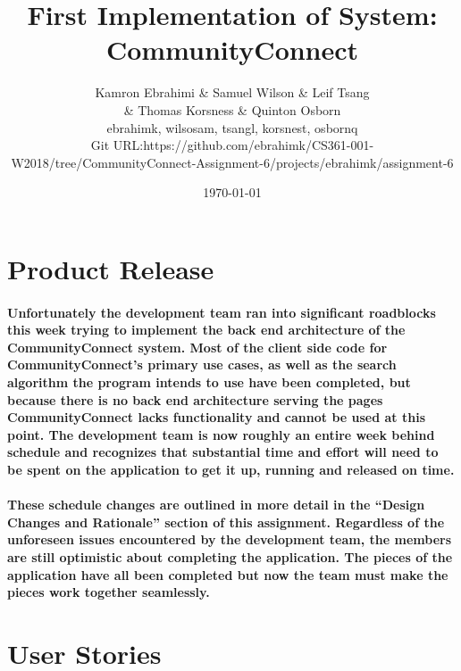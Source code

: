 \documentclass[12pt]{article}
\title{First Implementation of System: CommunityConnect}
\author{Kamron Ebrahimi \& Samuel Wilson \& Leif Tsang \\ \& Thomas Korsness  \& Quinton Osborn \\ ebrahimk, wilsosam, tsangl, korsnest, osbornq \\ \scriptsize{Git URL:https://github.com/ebrahimk/CS361-001-W2018/tree/CommunityConnect-Assignment-6/projects/ebrahimk/assignment-6}}
\date{\today}
\begin{document}
\maketitle

\tableofcontents

\newpage
\section{\bf  Product Release}
  \paragraph{\normalfont \indent  Unfortunately the development team ran into significant roadblocks this week trying to implement the back end architecture of the CommunityConnect system. Most of the client side code for CommunityConnect’s primary use cases,  as well as the search algorithm the program intends to use have been completed, but because there is no back end architecture serving the pages CommunityConnect lacks functionality and cannot be used at this point. The development team is now roughly an entire week behind schedule and recognizes that substantial time and effort will need to be spent on the application to get it up, running and released on time.
  }
  \paragraph{\normalfont \indent These schedule changes are outlined in more detail in the “Design Changes and Rationale” section of this assignment. Regardless of the unforeseen issues encountered by the development team, the members are still optimistic about completing the application. The pieces of the application have all been completed but now the team must make the pieces work together seamlessly.
  }


\section{\bf  User Stories }
\end{document}
